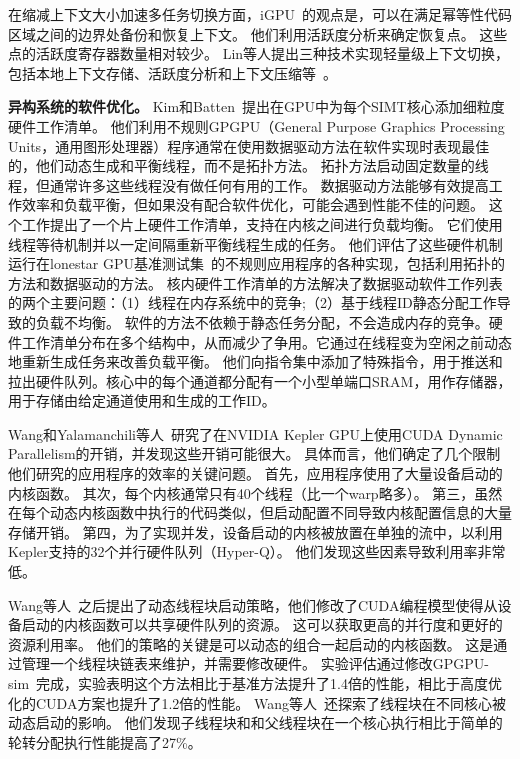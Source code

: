 在缩减上下文大小加速多任务切换方面，iGPU~的观点是，可以在满足幂等性代码区域之间的边界处备份和恢复上下文。 
他们利用活跃度分析来确定恢复点。
这些点的活跃度寄存器数量相对较少。
Lin等人提出三种技术实现轻量级上下文切换，包括本地上下文存储、活跃度分析和上下文压缩等~。


\textbf{异构系统的软件优化。}
Kim和Batten~提出在GPU中为每个SIMT核心添加细粒度硬件工作清单。
他们利用不规则GPGPU（General Purpose Graphics Processing Units，通用图形处理器）程序通常在使用数据驱动方法在软件实现时表现最佳的，他们动态生成和平衡线程，而不是拓扑方法。
拓扑方法启动固定数量的线程，但通常许多这些线程没有做任何有用的工作。
数据驱动方法能够有效提高工作效率和负载平衡，但如果没有配合软件优化，可能会遇到性能不佳的问题。
这个工作提出了一个片上硬件工作清单，支持在内核之间进行负载均衡。
它们使用线程等待机制并以一定间隔重新平衡线程生成的任务。
他们评估了这些硬件机制运行在lonestar GPU基准测试集~的不规则应用程序的各种实现，包括利用拓扑的方法和数据驱动的方法。
核内硬件工作清单的方法解决了数据驱动软件工作列表的两个主要问题：（1）线程在内存系统中的竞争;（2）基于线程ID静态分配工作导致的负载不均衡。
软件的方法不依赖于静态任务分配，不会造成内存的竞争。硬件工作清单分布在多个结构中，从而减少了争用。它通过在线程变为空闲之前动态地重新生成任务来改善负载平衡。
他们向指令集中添加了特殊指令，用于推送和拉出硬件队列。核心中的每个通道都分配有一个小型单端口SRAM，用作存储器，用于存储由给定通道使用和生成的工作ID。


Wang和Yalamanchili等人~研究了在NVIDIA Kepler GPU上使用CUDA Dynamic Parallelism的开销，并发现这些开销可能很大。
具体而言，他们确定了几个限制他们研究的应用程序的效率的关键问题。 
首先，应用程序使用了大量设备启动的内核函数。 
其次，每个内核通常只有40个线程（比一个warp略多）。 
第三，虽然在每个动态内核函数中执行的代码类似，但启动配置不同导致内核配置信息的大量存储开销。 
第四，为了实现并发，设备启动的内核被放置在单独的流中，以利用Kepler支持的32个并行硬件队列（Hyper-Q）。 
他们发现这些因素导致利用率非常低。

Wang等人~之后提出了动态线程块启动策略，他们修改了CUDA编程模型使得从设备启动的内核函数可以共享硬件队列的资源。
这可以获取更高的并行度和更好的资源利用率。
他们的策略的关键是可以动态的组合一起启动的内核函数。
这是通过管理一个线程块链表来维护，并需要修改硬件。
实验评估通过修改GPGPU-sim~完成，实验表明这个方法相比于基准方法提升了1.4倍的性能，相比于高度优化的CUDA方案也提升了1.2倍的性能。
Wang等人~还探索了线程块在不同核心被动态启动的影响。
他们发现子线程块和和父线程块在一个核心执行相比于简单的轮转分配执行性能提高了27\%。


